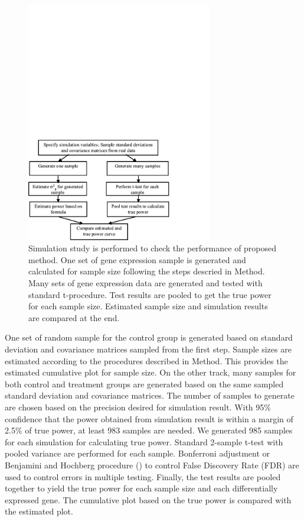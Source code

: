 \documentclass{bioinfo}
\begin{document}
\begin{figure}[h]
    \centerline{\includegraphics*[width=3.2in]{SimuFC.pdf}}
    \caption[Flow Chart for Simulation Study]
    {Simulation study is performed to check the performance of proposed method.
     One set of gene expression sample is generated and calculated for sample size following the steps descried in Method. Many sets of gene expression data are generated and
     tested with standard t-procedure. Test results are pooled to get the true power for
     each sample size. Estimated sample size and simulation results are compared at the end.}
    \label{fig:SimuFC}
\end{figure}

One set of random sample for the control group is generated based on standard deviation and covariance matrices sampled from
the first step. Sample sizes are estimated according to the procedures described in Method. This provides the estimated
cumulative plot for sample size. On the other track, many samples for both control and treatment groups are generated based on
the same sampled standard deviation and covariance matrices. The number of samples to generate are chosen based on the
precision desired for simulation result. With 95\% confidence that the power obtained from simulation result is within a margin
of 2.5\% of true power, at least 983 samples are needed. We generated 985 samples for each simulation for calculating true
power. Standard 2-sample t-test with pooled variance are performed for each sample. Bonferroni adjustment or Benjamini and
Hochberg procedure (\citealp{Benjamini95}) to control False Discovery Rate (FDR) are used to control errors in multiple
testing. Finally, the test results are pooled together to yield the true power for each sample size and each differentially
expressed gene. The cumulative plot based on the true power is compared with the estimated plot.
\end{document}
